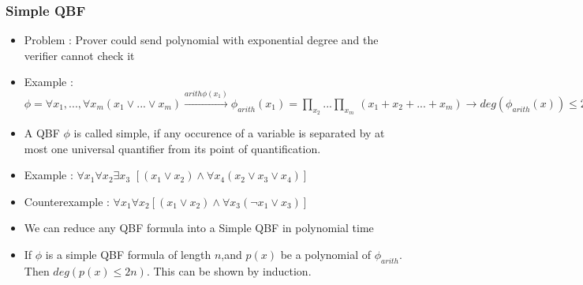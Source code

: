 \documentclass[hyperref={pdfpagelabels=false},t,10pt]{beamer}
\begin{document}
\begin{frame}
  \frametitle{Simple QBF}
\begin{itemize}
  \item Problem : Prover could send polynomial with exponential degree and the verifier cannot check it \pause
  \item Example : $\phi = \forall x_1, ... , \forall x_m (x_1 \lor ... \lor x_m) \xrightarrow{arith \phi(x_1)} \phi_{arith}(x_1) = \prod_{x_2}^{} ...\prod_{x_m}^{}\, (x_1 +x_2+ ...+ x_m) \rightarrow deg(\phi_{arith}(x)) \leq 2^{m-1}$ \pause
  \item A QBF $\phi$ is called simple, if any occurence of a variable is separated by at most one universal quantifier from its point of quantification.
  \item Example : $\forall x_1 \forall x_2 \exists x_3$ $[(x_1 \lor x_2) \land \forall x_4 (x_2 \lor x_3 \lor x_4)]$
  \item Counterexample : $\forall x_1 \forall x_2 [(x_1 \lor x_2) \land \forall x_3 (\neg x_1 \lor x_3)]$ \pause
  \item We can reduce any QBF formula into a Simple QBF in polynomial time
  \item If $\phi$ is a simple QBF formula of length $n$,and $p(x)$ be a polynomial of $\phi_{arith}$. Then $deg(p(x) \leq 2n)$. This can be shown by induction.
\end{itemize}
\end{frame}
\end{document}
